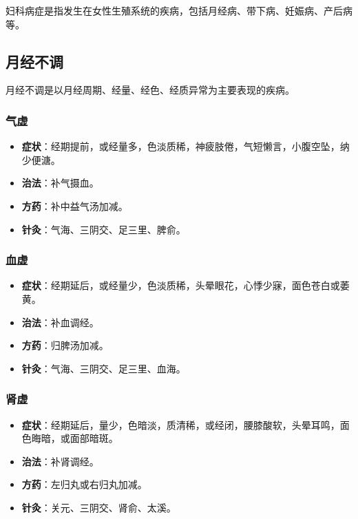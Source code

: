 \documentclass[12pt,UTF8]{ctexbook}
\begin{document}
妇科病症是指发生在女性生殖系统的疾病，包括月经病、带下病、妊娠病、产后病等。

\subsection{月经不调}

月经不调是以月经周期、经量、经色、经质异常为主要表现的疾病。

\subsubsection{气虚}

\begin{itemize}
\item \textbf{症状}：经期提前，或经量多，色淡质稀，神疲肢倦，气短懒言，小腹空坠，纳少便溏。
\item \textbf{治法}：补气摄血。
\item \textbf{方药}：补中益气汤加减。
\item \textbf{针灸}：气海、三阴交、足三里、脾俞。
\end{itemize}

\subsubsection{血虚}

\begin{itemize}
\item \textbf{症状}：经期延后，或经量少，色淡质稀，头晕眼花，心悸少寐，面色苍白或萎黄。
\item \textbf{治法}：补血调经。
\item \textbf{方药}：归脾汤加减。
\item \textbf{针灸}：气海、三阴交、足三里、血海。
\end{itemize}

\subsubsection{肾虚}

\begin{itemize}
\item \textbf{症状}：经期延后，量少，色暗淡，质清稀，或经闭，腰膝酸软，头晕耳鸣，面色晦暗，或面部暗斑。
\item \textbf{治法}：补肾调经。
\item \textbf{方药}：左归丸或右归丸加减。
\item \textbf{针灸}：关元、三阴交、肾俞、太溪。
\end{itemize}
\end{document}
